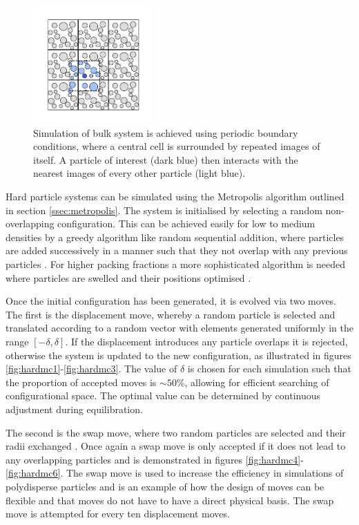 \begin{figure}[bt]
	\vspace{5mm}
	\includegraphics[width=4.5cm]{./figures/methods/mc_move_g.pdf}
	\caption{Simulation of bulk system is achieved using periodic boundary conditions, where a central cell is surrounded by repeated images of itself. A particle of interest (dark blue) then interacts with the nearest images of every other particle (light blue).}
	\label{fig:pbc}     
\end{figure}

Hard particle systems can be simulated using the Metropolis algorithm outlined in section \ref{ssec:metropolis}.
The system is initialised by selecting a random non\--overlapping configuration.
This can be achieved easily for low to medium densities by a greedy algorithm like random sequential addition, where particles are added successively in a manner such that they not overlap with any previous particles \cite{Widom1966}.
For higher packing fractions a more sophisticated algorithm is needed where particles are swelled and their positions optimised \cite{Woodcock1976}.

Once the initial configuration has been generated, it is evolved via two \mc{} moves.
The first is the displacement move, whereby a random particle is selected and translated according to a random vector with elements generated uniformly in the range $\left[-\delta,\delta\right]$.
If the displacement introduces any particle overlaps it is rejected, otherwise the system is updated to the new configuration, as illustrated in figures \ref{fig:hardmc1}\--\ref{fig:hardmc3}.
The value of $\delta$ is chosen for each simulation such that the proportion of accepted moves is $\sim 50\%$, allowing for efficient searching of configurational space.
The optimal value can be determined by continuous adjustment during equilibration.

The second is the swap move, where two random particles are selected and their radii exchanged \cite{Grigera2001,Ninarello2017}. 
Once again a swap move is only accepted if it does not lead to any overlapping particles and is demonstrated in figures \ref{fig:hardmc4}\--\ref{fig:hardmc6}.
The swap move is used to increase the efficiency in simulations of polydisperse particles and is an example of how the design of \mc{} moves can be flexible and that moves do not have to have a direct physical basis. 
The swap move is attempted for every ten displacement moves. 

